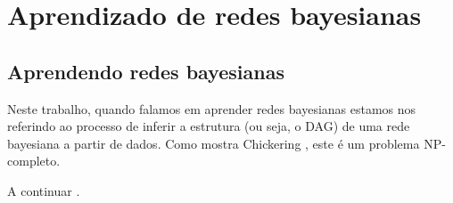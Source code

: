 \chapter{Aprendizado de redes bayesianas}
\label{cap:aprendizado}

\section{Aprendendo redes bayesianas}

Neste trabalho, quando falamos em aprender redes bayesianas estamos nos referindo ao processo de inferir a estrutura (ou seja, o DAG) de uma rede bayesiana a partir de dados. Como mostra Chickering \cite{chickering}, este é um problema NP-completo.

\vspace{2em}

A continuar \cite{nie}. %
